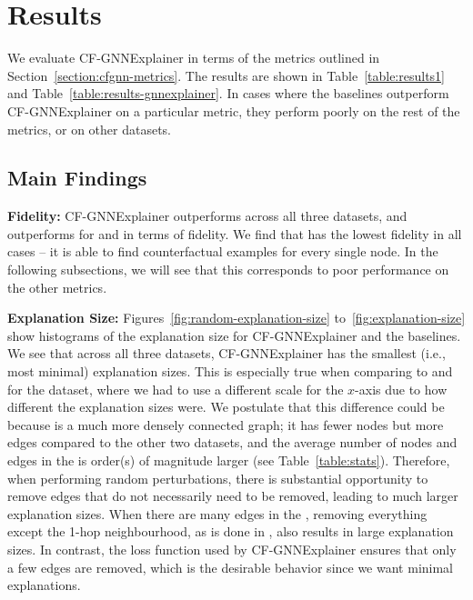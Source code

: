 
\section{Results}
\label{section:cfgnn-results}


We evaluate CF-GNNExplainer in terms of the metrics outlined in Section~\ref{section:cfgnn-metrics}. 
The results are shown in Table~\ref{table:results1} and Table~\ref{table:results-gnnexplainer}.  
In cases where the baselines outperform CF-GNNExplainer on a particular metric, they perform poorly on the rest of the metrics, or on other datasets. 




\subsection{Main Findings}

\textbf{Fidelity:}
CF-GNNExplainer outperforms \basekeep{} across all three datasets, and outperforms \baserm{} for \synfour{} and \synfive{} in terms of fidelity. 
We find that \baserand{} has the lowest fidelity in all cases -- it is able to find counterfactual examples for every single node. 
In the following subsections, we will see that this corresponds to poor performance on the other metrics.




\medskip \noindent
\textbf{Explanation Size:}
Figures~\ref{fig:random-explanation-size} to~\ref{fig:explanation-size} show histograms of the explanation size for CF-GNNExplainer and the baselines. 
We see that across all three datasets, CF-GNNExplainer has the smallest (i.e., most minimal) explanation sizes. 
This is especially true when comparing to \baserand{} and \basekeep{} for the \synone{} dataset, where we had to use a different scale for the $x$-axis due to how different the explanation sizes were. 
We postulate that this difference could be because \synone{} is a much more densely connected graph;
it has fewer nodes but more edges compared to the other two datasets, and the average number of nodes and edges in the \cgraph{} is order(s) of magnitude larger (see Table~\ref{table:stats}). 
Therefore, when performing random perturbations, there is substantial opportunity to remove edges that do not necessarily need to be removed, leading to much larger explanation sizes.
When there are many edges in the \cgraph{}, removing everything except the 1-hop neighbourhood, as is done in \basekeep{}, also results in large explanation sizes. 
In contrast, the loss function used by CF-GNNExplainer ensures that only a few edges are removed, which is the desirable behavior since we want minimal explanations. 

